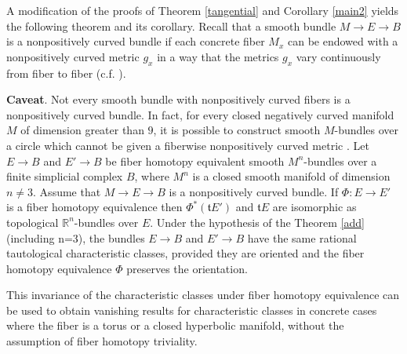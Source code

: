 \documentclass[onecolumn,notitlepage,11pt]{article}
\newcommand{\Z}{\mathbb{Z}}
\newcommand{\R}{\mathbb{R}}
\newenvironment{customthm}[1]
  {\renewcommand\theinnercustomthm{#1}\innercustomthm}
  {\endinnercustomthm}  %
\newenvironment{customcoro}[1]
  {\renewcommand\theinnercustomcoro{#1}\innercustomcoro}
  {\endinnercustomcoro}
\theoremstyle{definition}
\begin{document}
A modification of the proofs of 
Theorem \ref{tangential} and Corollary \ref{main2} yields the
following theorem and its corollary. Recall that
a smooth bundle $M\to E\to B$ is a nonpositively curved bundle if each
concrete fiber $M_x$ can be endowed with a nonpositively curved 
metric $g_x$ in a way that the metrics $g_x$ vary continuously from
fiber to fiber (c.f. \cite{gafa}).

\textbf{Caveat}. Not every smooth bundle with nonpositively curved fibers
is a nonpositively curved bundle. In fact, for every closed negatively
curved manifold $M$ of dimension greater than $9$, it is possible
to construct smooth $M$-bundles over a circle which cannot be given
a fiberwise 
nonpositively curved metric \cite{FO15}.
\begin{customthm}{C}\label{add}
Let $E\to B$ and $E'\to B$ be fiber homotopy equivalent 
smooth $M^n$-bundles over a finite simplicial complex $B$,
where $M^n$ is a closed smooth manifold of 
dimension $n\neq 3$. Assume that 
$M\to E\to B$ is a nonpositively curved bundle.
If $\Phi:E\to E'$ is a fiber homotopy equivalence then
$\Phi^*(\mathfrak{t}E')$ and $\mathfrak{t}E$ are isomorphic as
topological
$\R^n$-bundles over $E$. 
\end{customthm}
\begin{customcoro}{C.1}\label{sameclasses}
Under the hypothesis of the Theorem \ref{add}
(including n=3), the bundles 
$E\to B$ and $E'\to B$ have the same rational tautological 
characteristic classes, provided they are oriented and the fiber
homotopy equivalence $\Phi$ preserves the orientation.
\end{customcoro}

This invariance of the characteristic classes under fiber 
homotopy equivalence can
be used to obtain vanishing results for characteristic classes
in concrete cases where the fiber is a torus or 
a closed hyperbolic manifold, without the assumption of
fiber homotopy triviality.
\end{document}
